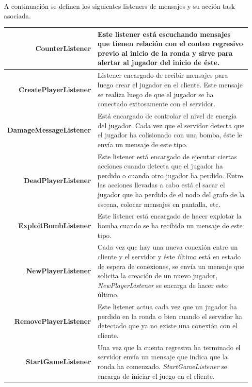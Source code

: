 \documentclass[a4paper,12pt,openany,oneside]{book}
\begin{document}
A continuación se definen los siguientes listeners de mensajes y su acción task asociada.

\begin{flushleft}
\begin{tabular}{|r|p{8.5cm}|}
\hline
\textbf{CounterListener} & Este listener está escuchando mensajes que tienen relación con el conteo regresivo previo al inicio de la ronda y sirve para alertar al jugador del inicio de éste. \\	
\hline
\textbf{CreatePlayerListener} & Listener encargado de recibir mensajes para luego crear el jugador en el cliente. Este mensaje se realiza luego de que el jugador se ha conectado exitosamente con el servidor. \\	
\hline
\textbf{DamageMessageListener} & Está encargado de controlar el nivel de energía del jugador. Cada vez que el servidor detecta que el jugador ha colisionado con una bomba, éste le envía un mensaje de este tipo. \\	
\hline
\textbf{DeadPlayerListener} & Este listener está encargado de ejecutar ciertas acciones cuando detecta que el jugador ha perdido o cuando otro jugador ha perdido. Entre las acciones llevadas a cabo está el sacar el jugador que ha perdido de el nodo del grafo de la escena, colocar mensajes en pantalla, etc. \\	
\hline
\textbf{ExploitBombListener} & Este listener está encargado de hacer explotar la bomba cuando se ha recibido un mensaje de este tipo. \\	
\hline
\textbf{NewPlayerListener} & Cada vez que hay una nueva conexión entre un cliente y el servidor y éste último está en estado de espera de conexiones, se envía un mensaje que solicita la creación de un nuevo jugador, \textit{NewPlayerListener} se encarga de hacer esto último.\\	
\hline
\textbf{RemovePlayerListener} & Este listener actua cada vez que un jugador ha perdido en la ronda o bien cuando el servidor ha detectado que ya no existe una conexión con el cliente. \\	
\hline
\textbf{StartGameListener} & Una vez que la cuenta regresiva ha terminado el servidor envía un mensaje que indica que la ronda ha comenzado. \textit{StartGameListener} se encarga de iniciar el juego en el cliente. \\	
\hline
\end{tabular}
\end{flushleft}
\end{document}
